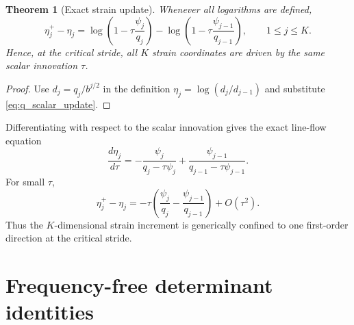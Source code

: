 \documentclass[11pt]{amsart}
\numberwithin{equation}{section}
\theoremstyle{plain}
\newtheorem{theorem}{Theorem}[section]
\theoremstyle{definition}
\theoremstyle{remark}
\begin{document}
\begin{theorem}[Exact strain update]
\label{thm:exact_strain_update}
Whenever all logarithms are defined,
\begin{equation}
\boxed{
\eta_j^+-\eta_j
=
\log\left(1-\tau\frac{\psi_j}{q_j}\right)
-
\log\left(1-\tau\frac{\psi_{j-1}}{q_{j-1}}\right),
\qquad 1\leq j\leq K.
}
\label{eq:exact_eta_scalar_update}
\end{equation}
Hence, at the critical stride, all $K$ strain coordinates are driven by the same scalar innovation $\tau$.
\end{theorem}

\begin{proof}
Use $d_j=q_j/b^{j/2}$ in the definition $\eta_j=\log(d_j/d_{j-1})$ and substitute \eqref{eq:q_scalar_update}.
\end{proof}

Differentiating with respect to the scalar innovation gives the exact line-flow equation
\begin{equation}
\frac{d\eta_j}{d\tau}
=
-\frac{\psi_j}{q_j-\tau\psi_j}
+
\frac{\psi_{j-1}}{q_{j-1}-\tau\psi_{j-1}}.
\label{eq:eta_tau_flow}
\end{equation}
For small $\tau$,
\begin{equation}
\eta_j^+-\eta_j
=
-\tau
\left(
\frac{\psi_j}{q_j}
-
\frac{\psi_{j-1}}{q_{j-1}}
\right)
+O(\tau^2).
\label{eq:eta_small_tau}
\end{equation}
Thus the $K$-dimensional strain increment is generically confined to one first-order direction at the critical stride.

\section{Frequency-free determinant identities}
\label{sec:frequency_free_determinants}
\end{document}
